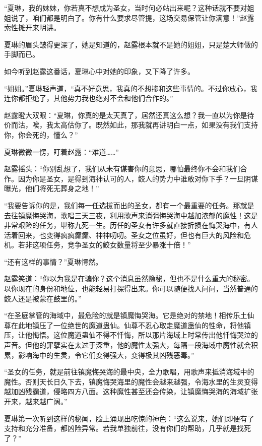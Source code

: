 \begin{this_body}
“夏琳，我的妹妹，你若真不想成为圣女，当时何必站出来呢？这种话就不要对姐姐说了，咱们都是明白了。你有什么要求尽管提，这场交易保管让你满意！”赵露索性摊开来明讲。

夏琳的眉头皱得更深了，她是知道的，赵露根本就不是她的姐姐，只是楚大师做的手脚而已。

如今听到赵露这番话，夏琳心中对她的印象，又下降了许多。

“姐姐。”夏琳轻声道，“真不好意思，我真的不想掺和这些事情的。不过你放心，我连你都拒绝了，其他势力我也绝对不会和他们合作的。”

赵露瞪大双眼：“夏琳，你真的是太天真了，居然还真这么想？我一直以为你是待价而沽，唉，我太高估你了。既然如此，那我就再讲明白一点，如果没有我们支持你，你会死的，懂么？”

夏琳微微一愣，盯着赵露：“难道……”

赵露摇头：“你别乱想了，我们从未有谋害你的意思，哪怕最终你不会和我们合作。因为你是圣女，是得到海神认可的人，鲛人的势力中谁敢对你下手？一旦阴谋曝光，他们将死无葬身之地！”

“我要告诉你的是，我们每一任选拔而出的圣女，都有一个最重要的任务。那就是去往镇魔悔哭海，歌唱三天三夜，利用歌声来消弭悔哭海中越加浓郁的魔性！这是非常艰险的任务，堪称九死一生。历任的圣女有许多就直接折损在悔哭海中，有人活着回来，也变得疯疯癫癫、神神叨叨。圣女之位虽好，但也有巨大的风险和危机。若非这项任务，竞争圣女的鲛女数量将至少暴涨十倍！”

“还有这样的事情？”夏琳愕然。

赵露笑道：“你以为我是在骗你？这个消息虽然隐秘，但也不是什么重大的秘密。以你现在的身份和地位，也能轻易打探得出来。你可以随便找人问问，当然普通的鲛人还是被蒙在鼓里的。”

“在圣庭掌管的海域中，最危险的就是镇魔悔哭海。它是绝对的禁地！相传乐土仙尊在此地镇压了一位绝世的魔道蛊仙。仙尊不忍心取走魔道蛊仙的性命，将他镇压，让他悔悟。这位魔道蛊仙不得不忏悔，所以那片海域上时常传出他忏悔哭泣的声音。但他的罪孽实在太过于深重，他的魔性太强大，每隔一段海域中魔性就会积累，影响海中的生灵，令它们变得强大，变得极其凶残恶毒。”

“圣女的任务，就是前往镇魔悔哭海的最中央，全力歌唱，用歌声来抵消海域中的魔性。否则天长日久下去，镇魔悔哭海里的魔性会越来越强，令海水里的生灵变得越加凶残霸道，侵略四方八面。这种魔性甚至还会传染，让镇魔悔哭海的海域扩张开来，越来越广阔。”

夏琳第一次听到这样的秘闻，脸上涌现出吃惊的神色：“这么说来，她们即便有了支持和充分准备，都凶险异常。若我单独前往，没有你们的帮助，几乎就是找死了？”


\end{this_body}
